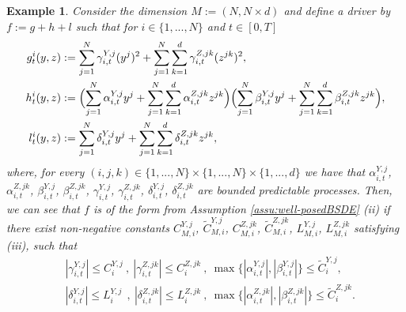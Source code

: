 \documentclass[10pt,a4paper]{article}
\theoremstyle{plain}
\newtheorem{example}[Theorem]{Example}
\theoremstyle{definition}
\numberwithin{equation}{section}
\begin{document}


\begin{example}
Consider the dimension $M := (N,N\times d)$ and define a driver by $f := g + h + l$ such that for $i \in \{1,...,N\}$ and $t \in [0,T]$
\begin{align*}
g_{t}^{i}(y,z) &:= \sum_{j=1}^{N}\gamma_{i,t}^{Y,j}(y^{j})^{2} + \sum_{j=1}^{N}\sum_{k=1}^{d}\gamma_{i,t}^{Z,jk}(z^{jk})^{2}, \\
h_{t}^{i}(y,z) &:= \Bigl(\sum_{j=1}^{N}\alpha_{i,t}^{Y,j}y^{j} + \sum_{j=1}^{N}\sum_{k=1}^{d}\alpha_{i,t}^{Z,jk}z^{jk}\Bigr)\Bigl(\sum_{j=1}^{N}\beta_{i,t}^{Y,j}y^{j} + \sum_{j=1}^{N}\sum_{k=1}^{d}\beta_{i,t}^{Z,jk}z^{jk}\Bigr), \\
l_{t}^{i}(y,z) &:= \sum_{j=1}^{N}\delta_{i,t}^{Y,j}y^{j} + \sum_{j=1}^{N}\sum_{k=1}^{d}\delta_{i,t}^{Z,jk}z^{jk},
\end{align*}
where, for every $(i,j,k) \in \{1,...,N\}\times \{1,...,N\} \times \{1,...,d\}$ we have that $\alpha_{i,t}^{Y,j}$, $\alpha_{i,t}^{Z,jk}$, $\beta_{i,t}^{Y,j}$, $\beta_{i,t}^{Z,jk}$, $\gamma_{i,t}^{Y,j}$, $\gamma_{i,t}^{Z,jk}$, $\delta_{i,t}^{Y,j}$, $\delta_{i,t}^{Z,jk}$ are bounded predictable processes. Then, we can see that $f$ is of the form from Assumption \ref{assu:well-posedBSDE} \textnormal{(ii)} if there exist non-negative constants $C_{M,i}^{Y,j}$, $\tilde{C}_{M,i}^{Y,j}$, $C_{M,i}^{Z,jk}$, $\tilde{C}_{M,i}^{Z,jk}$, $L_{M,i}^{Y,j}$, $L_{M,i}^{Z,jk}$ satisfying \textnormal{(iii)}, such that
\begin{align*}
&|\gamma_{i,t}^{Y,j}| \leq C_{i}^{Y,j} \ , \ |\gamma_{i,t}^{Z,jk}| \leq C_{i}^{Z,jk} \ , \ \max\bigl\{|\alpha_{i,t}^{Y,j}|,|\beta_{i,t}^{Y,j}|\bigr\} \leq \tilde{C}_{i}^{Y,j}, \\
&|\delta_{i,t}^{Y,j}| \leq L_{i}^{Y,j} \ \ , \ |\delta_{i,t}^{Z,jk}| \leq L_{i}^{Z,jk} \ , \ \max\bigl\{|\alpha_{i,t}^{Z,jk}|,|\beta_{i,t}^{Z,jk}|\bigr\} \leq \tilde{C}_{i}^{Z,jk}.
\end{align*}
\end{example}
\end{document}
